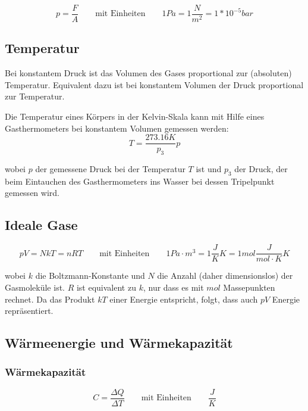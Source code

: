 \documentclass[11pt]{article}
\begin{document}
\begin{equation*}
	p = \frac{F}{A} \qquad\text{mit Einheiten}\qquad 1 Pa = 1 \frac{N}{m^2} = 1 * 10^{-5} bar
\end{equation*}

\subsection{Temperatur}

Bei konstantem Druck ist das Volumen des Gases proportional zur (absoluten) Temperatur. Equivalent dazu ist bei konstantem Volumen der Druck proportional zur Temperatur. \newline

Die Temperatur eines K{\"o}rpers in der Kelvin-Skala kann mit Hilfe eines Gasthermometers bei konstantem Volumen gemessen werden:
\begin{equation*}
	T = \frac{273.16K}{p_3}p
\end{equation*}

wobei $p$ der gemessene Druck bei der Temperatur $T$ ist und $p_3$ der Druck, der beim Eintauchen des Gasthermometers ins Wasser bei dessen Tripelpunkt gemessen wird.

\subsection{Ideale Gase}

\begin{equation*}
	pV = NkT = nRT \qquad\text{mit Einheiten}\qquad 1 Pa \cdot m^3 = 1 \frac{J}{K} K = 1 mol \frac{J}{mol \cdot K} K
\end{equation*}

wobei $k$ die Boltzmann-Konstante und $N$ die Anzahl (daher dimensionslos) der Gasmolek{\"u}le ist. $R$ ist equivalent zu $k$, nur dass es mit $mol$ Massepunkten rechnet. Da das Produkt $kT$ einer Energie entspricht, folgt, dass auch $pV$ Energie repr{\"a}sentiert.

\subsection{W{\"a}rmeenergie und W{\"a}rmekapazit{\"a}t}

\subsubsection{W{\"a}rmekapazit{\"a}t}
\begin{equation*}
	C = \frac{\Delta Q}{\Delta T} \qquad\text{mit Einheiten}\qquad \frac{J}{K}
\end{equation*}
\end{document}
